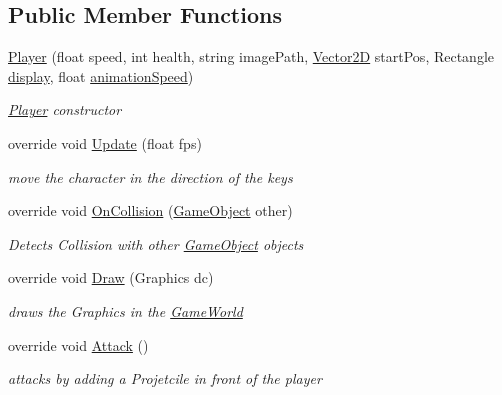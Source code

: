 \subsection*{Public Member Functions}
\begin{DoxyCompactItemize}
\item 
\hyperlink{class_mage_twinstick_1_1_player_ab0f3c00d033f0f20e743c04ae0eb6b11}{Player} (float speed, int health, string image\+Path, \hyperlink{class_mage_twinstick_1_1_vector2_d}{Vector2\+D} start\+Pos, Rectangle \hyperlink{class_mage_twinstick_1_1_game_object_a5807df7f837dc87c8955a008d0b27b50}{display}, float \hyperlink{class_mage_twinstick_1_1_game_object_a5d21c31402c27c5a19f2a62d98720456}{animation\+Speed})
\begin{DoxyCompactList}\small\item\em \hyperlink{class_mage_twinstick_1_1_player}{Player} constructor \end{DoxyCompactList}\item 
override void \hyperlink{class_mage_twinstick_1_1_player_a5324e0350784da0f66369ec5ef52516a}{Update} (float fps)
\begin{DoxyCompactList}\small\item\em move the character in the direction of the keys \end{DoxyCompactList}\item 
override void \hyperlink{class_mage_twinstick_1_1_player_adb9172ee6c160eb686076749d29be061}{On\+Collision} (\hyperlink{class_mage_twinstick_1_1_game_object}{Game\+Object} other)
\begin{DoxyCompactList}\small\item\em Detects Collision with other \hyperlink{class_mage_twinstick_1_1_game_object}{Game\+Object} objects \end{DoxyCompactList}\item 
override void \hyperlink{class_mage_twinstick_1_1_player_a2ccf76e50c0e5fa6642da04a4a5c4fa8}{Draw} (Graphics dc)
\begin{DoxyCompactList}\small\item\em draws the Graphics in the \hyperlink{class_mage_twinstick_1_1_game_world}{Game\+World} \end{DoxyCompactList}\item 
override void \hyperlink{class_mage_twinstick_1_1_player_a418c80bddb416cd2cdd180ab21831f57}{Attack} ()
\begin{DoxyCompactList}\small\item\em attacks by adding a Projetcile in front of the player \end{DoxyCompactList}\end{DoxyCompactItemize}
